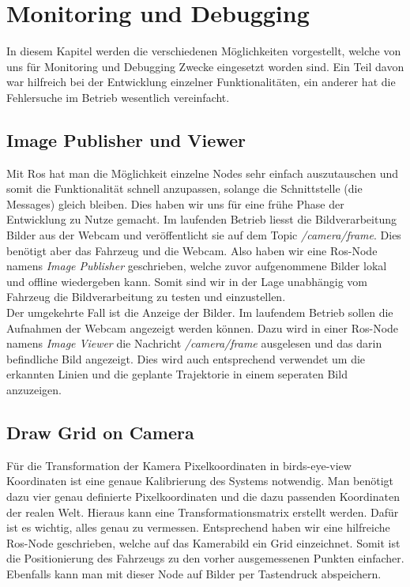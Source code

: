 \section{Monitoring und Debugging}


In diesem Kapitel werden die verschiedenen M\"oglichkeiten vorgestellt, welche von uns f\"ur Monitoring und Debugging Zwecke eingesetzt worden sind. Ein Teil davon war hilfreich bei der Entwicklung einzelner Funktionalit\"aten, ein anderer hat die Fehlersuche im Betrieb wesentlich vereinfacht.

\subsection{Image Publisher und Viewer}
Mit Ros hat man die M\"oglichkeit einzelne Nodes sehr einfach auszutauschen und somit die Funktionalit\"at schnell anzupassen, solange die Schnittstelle (die Messages) gleich bleiben. Dies haben wir uns f\"ur eine fr\"uhe Phase der Entwicklung zu Nutze gemacht. Im laufenden Betrieb liesst die Bildverarbeitung Bilder aus der Webcam und ver\"offentlicht sie auf dem Topic \textit{/camera/frame}. Dies ben\"otigt aber das Fahrzeug und die Webcam. Also haben wir eine Ros-Node namens \textit{Image Publisher} geschrieben, welche zuvor aufgenommene Bilder lokal und offline wiedergeben kann. Somit sind wir in der Lage unabh\"angig vom Fahrzeug die Bildverarbeitung zu testen und einzustellen.\\

Der umgekehrte Fall ist die Anzeige der Bilder. Im laufendem Betrieb sollen die Aufnahmen der Webcam angezeigt werden k\"onnen. Dazu wird in einer Ros-Node namens \textit{Image Viewer} die Nachricht \textit{/camera/frame} ausgelesen und das darin befindliche Bild angezeigt. Dies wird auch entsprechend verwendet um die erkannten Linien und die geplante Trajektorie in einem seperaten Bild anzuzeigen. 

\subsection{Draw Grid on Camera}
F\"ur die Transformation der Kamera Pixelkoordinaten in birds-eye-view Koordinaten ist eine genaue Kalibrierung des Systems notwendig. Man ben\"otigt dazu vier genau definierte Pixelkoordinaten und die dazu passenden Koordinaten der realen Welt. Hieraus kann eine Transformationsmatrix erstellt werden. Daf\"ur ist es wichtig, alles genau zu vermessen. Entsprechend haben wir eine hilfreiche Ros-Node geschrieben, welche auf das Kamerabild ein Grid einzeichnet. Somit ist die Positionierung des Fahrzeugs zu den vorher ausgemessenen Punkten einfacher. Ebenfalls kann man mit dieser Node auf Bilder per Tastendruck abspeichern.

